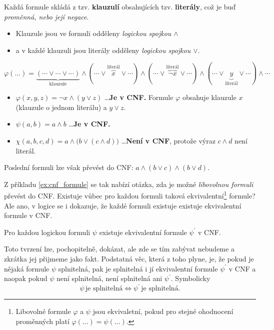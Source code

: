 Každá formule skládá z tzv. \textbf{klauzulí} obsahujících tzv. \textbf{literály}, což je buď \emph{proměnná, nebo její negace}.
\begin{itemize}
    \item Klauzule jsou ve formuli odděleny \emph{logickou spojkou $\land$}
    \item a v každé klauzuli jsou literály odděleny \emph{logickou spojkou $\lor$}.
\end{itemize}
\[\varphi(\dots)=\underbrace{(\cdots\lor\cdots\lor\cdots)}_{\text{klauzule}}\land(\cdots\lor \overbrace{x}^{\text{literál}}\lor\cdots)\land(\cdots\lor\overbrace{\neg x}^{\text{literál}}\lor\cdots)\land(\cdots\lor \underbrace{y}_{\text{literál}}\lor\cdots)\land\cdots\]
\begin{example}\label{ex:cnf_formule}
    \begin{itemize}
        \item \(\varphi(x,y,z)=\neg x\land (y\lor z)\) \dots \textbf{Je v CNF.} Formule $\varphi$ obsahuje klauzule $x$ (klauzule o jednom literálu) a $y\lor z$.
        \item \(\psi(a,b)=a\land b\) \dots \textbf{Je v CNF.}
        \item \(\chi(a,b,c,d)=a\land \big(b\lor (c\land d)\big)\) \dots \textbf{Není v CNF}, protože výraz $c\land d$ není literál.
    \end{itemize}
    Poslední formuli lze však převést do CNF: $a\land (b\lor c)\land (b\lor d)$.
\end{example}
Z příkladu \ref{ex:cnf_formule} se tak nabízí otázka, zda je možné \emph{libovolnou formuli} převést do CNF. Existuje vůbec pro každou formuli taková ekvivalentní\footnote{Libovolné formule $\varphi$ a $\psi$ jsou ekvivaletní, pokud pro stejné ohodnocení proměnných platí $\varphi(\dots)=\psi(\dots)$.} formule? Ale ano, v logice se i dokazuje, že každé formuli existuje existuje ekvivalentní formule v CNF.
\begin{theorem}
    Pro každou logickou formuli $\psi$ existuje ekvivalentní formule $\psi^\prime$ v CNF.
\end{theorem}
Toto tvrzení lze, pochopitelně, dokázat, ale zde se tím zabývat nebudeme a zkrátka jej přijmeme jako fakt. Podstatná věc, která z toho plyne, je, že pokud je nějaká formule $\psi$ splnitelná, pak je splnitelná i jí ekvivalentní formule $\psi^\prime$ v CNF a naopak pokud $\psi$ není splnitelná, není splnitelná ani $\psi^\prime$. Symbolicky
\[\psi\,\text{je splnitelná}\iff\psi^\prime\,\text{je splnitelná}.\]

